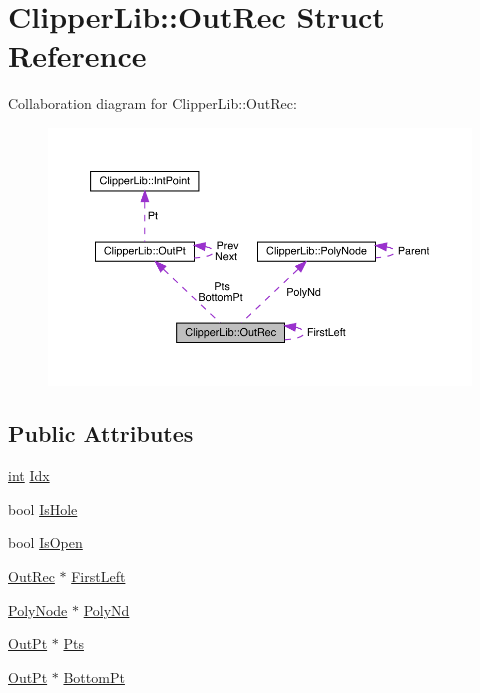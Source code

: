 \hypertarget{struct_clipper_lib_1_1_out_rec}{}\section{Clipper\+Lib\+::Out\+Rec Struct Reference}
\label{struct_clipper_lib_1_1_out_rec}


Collaboration diagram for Clipper\+Lib\+::Out\+Rec\+:
\nopagebreak
\begin{figure}[H]
\begin{center}
\leavevmode
\includegraphics[width=350pt]{struct_clipper_lib_1_1_out_rec__coll__graph}
\end{center}
\end{figure}
\subsection*{Public Attributes}
\begin{DoxyCompactItemize}
\item 
\mbox{\hyperlink{draw_8hh_aa620a13339ac3a1177c86edc549fda9b}{int}} \mbox{\hyperlink{struct_clipper_lib_1_1_out_rec_ae2c437dec114034a456a7238ab6d8055}{Idx}}
\item 
bool \mbox{\hyperlink{struct_clipper_lib_1_1_out_rec_a18b2b534b717139528047ba10a1c805c}{Is\+Hole}}
\item 
bool \mbox{\hyperlink{struct_clipper_lib_1_1_out_rec_a065731c084453a818939c219868a2fcc}{Is\+Open}}
\item 
\mbox{\hyperlink{struct_clipper_lib_1_1_out_rec}{Out\+Rec}} $\ast$ \mbox{\hyperlink{struct_clipper_lib_1_1_out_rec_aa8baa934f1a7687a16b88a579dec3dd4}{First\+Left}}
\item 
\mbox{\hyperlink{class_clipper_lib_1_1_poly_node}{Poly\+Node}} $\ast$ \mbox{\hyperlink{struct_clipper_lib_1_1_out_rec_a334af720a9e0a815ba690e80e32bebd1}{Poly\+Nd}}
\item 
\mbox{\hyperlink{struct_clipper_lib_1_1_out_pt}{Out\+Pt}} $\ast$ \mbox{\hyperlink{struct_clipper_lib_1_1_out_rec_a82e9cba88d46d0d60db0b0365c6bd02e}{Pts}}
\item 
\mbox{\hyperlink{struct_clipper_lib_1_1_out_pt}{Out\+Pt}} $\ast$ \mbox{\hyperlink{struct_clipper_lib_1_1_out_rec_adc4d612df109de83dca298204176ff0c}{Bottom\+Pt}}
\end{DoxyCompactItemize}


